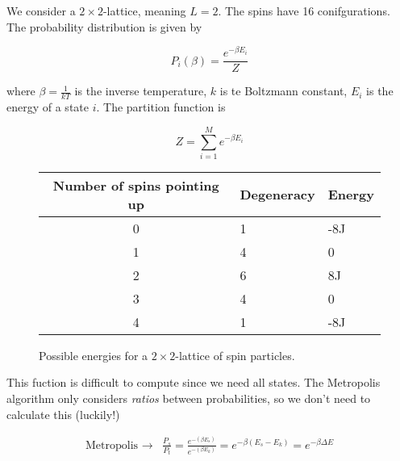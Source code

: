 \documentclass[11pt]{article}
\begin{document}
\begin{flushleft}
We consider a $2 \times 2$-lattice, meaning $L = 2$. The spins have 16 conifgurations. The probability distribution is given by

\begin{equation}
P_i(\beta) = \frac{e^{- \beta E_i}}{Z}
\end{equation}

where $\beta = \frac{1}{kT}$ is the inverse temperature, $k$ is te Boltzmann constant, $E_i$ is the energy of a state $i$. The partition function is 

\begin{equation}\label{Partition function}
Z = \sum_{i=1}^M e^{- \beta E_i}
\end{equation}

\begin{figure}
\centering
\begin{tabular}{|c|l|l|}
\hline
Number of spins pointing up & Degeneracy & Energy\\
\hline
0 & 1 &  -8J\\
1 & 4 & 0\\
2 & 6 & 8J\\
3 & 4 & 0\\
4 & 1 & -8J\\
\hline
\end{tabular}
\caption{Possible energies for a $2 \times 2$-lattice of spin particles.}
\end{figure}

\end{flushleft}

\begin{flushleft}

This fuction is difficult to compute since we need all states. The Metropolis algorithm only considers \textit{ratios} between probabilities, so we don't need to calculate this (luckily!)

\begin{align*}
\text{Metropolis } \rightarrow  &\frac{P_s}{P_t} = \frac{e^{-(\beta E_s)}}{e^{-(\beta E_k)}}
= e^{-\beta(E_s - E_k)}
= e^{-\beta \Delta E} 
\end{align*}


\end{flushleft}
\end{document}
